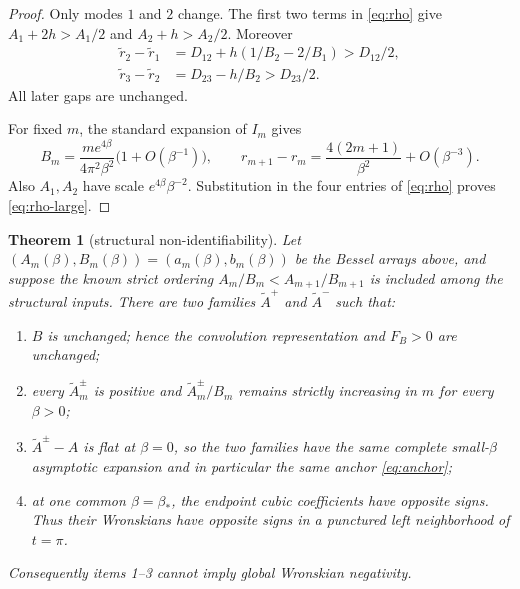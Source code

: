 \documentclass[11pt]{article}
\newtheorem{theorem}{Theorem}
\theoremstyle{definition}
\theoremstyle{remark}
\newcommand{\FB}{F_{\!B}}
\begin{document}
\begin{proof}
Only modes $1$ and $2$ change.  The first two terms in \eqref{eq:rho}
give $A_1+2h>A_1/2$ and $A_2+h>A_2/2$.  Moreover
\begin{align*}
 \widetilde r_2-\widetilde r_1
 &=D_{12}+h(1/B_2-2/B_1)>D_{12}/2,\\
 \widetilde r_3-\widetilde r_2
 &=D_{23}-h/B_2>D_{23}/2.
\end{align*}
All later gaps are unchanged.

For fixed $m$, the standard expansion of $I_m$ gives
\begin{equation}\label{eq:ratio-gap-large}
 B_m=\frac{m e^{4\beta}}{4\pi^2\beta^2}
 \bigl(1+O(\beta^{-1})\bigr),
 \qquad
 r_{m+1}-r_m=\frac{4(2m+1)}{\beta^2}
 +O(\beta^{-3}).
\end{equation}
Also $A_1,A_2$ have scale $e^{4\beta}\beta^{-2}$.  Substitution in
the four entries of \eqref{eq:rho} proves \eqref{eq:rho-large}.
\end{proof}

\begin{theorem}[structural non-identifiability]
\label{thm:nogo}
Let $(A_m(\beta),B_m(\beta))=(a_m(\beta),b_m(\beta))$ be the Bessel
arrays above, and suppose the known strict ordering
$A_m/B_m<A_{m+1}/B_{m+1}$ is included among the structural inputs.
There are two families $\widetilde A^+$ and $\widetilde A^-$ such that:
\begin{enumerate}
\item $B$ is unchanged; hence the convolution representation and
      $\FB>0$ are unchanged;
\item every $\widetilde A_m^\pm$ is positive and
      $\widetilde A_m^\pm/B_m$ remains strictly increasing in $m$ for
      every $\beta>0$;
\item $\widetilde A^\pm-A$ is flat at $\beta=0$, so the two families
      have the same complete small-$\beta$ asymptotic expansion and in
      particular the same anchor \eqref{eq:anchor};
\item at one common $\beta=\beta_*$, the endpoint cubic coefficients
      have opposite signs.  Thus their Wronskians have opposite signs
      in a punctured left neighborhood of $t=\pi$.
\end{enumerate}
Consequently items 1--3 cannot imply global Wronskian negativity.
\end{theorem}
\end{document}
